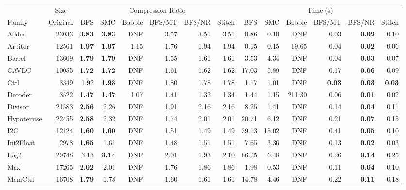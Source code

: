 \begin{tabular}{l r rrrrrr rrrrrr}
\toprule
& \multicolumn{1}{c}{Size} & \multicolumn{6}{c}{Compression Ratio} & \multicolumn{6}{c}{Time (s)} \\
\cmidrule(lr){2-2} \cmidrule(lr){3-8} \cmidrule(lr){9-14}
Family & Original & BFS & SMC & Babble & BFS/MT & BFS/NR & Stitch & BFS & SMC & Babble & BFS/MT & BFS/NR & Stitch \\
\midrule
Adder & 23033 & \textbf{3.83} & \textbf{3.83} & DNF & 3.57 & 3.51 & 3.51 & 0.86 & 0.10 & DNF & 0.03 & \textbf{0.02} & 0.10 \\
Arbiter & 12561 & \textbf{1.97} & \textbf{1.97} & 1.15 & 1.76 & 1.94 & 1.94 & 0.15 & 0.15 & 19.65 & 0.04 & \textbf{0.02} & 0.06 \\
Barrel & 13609 & \textbf{1.79} & \textbf{1.79} & DNF & 1.55 & 1.61 & 1.61 & 3.53 & 4.34 & DNF & 0.04 & \textbf{0.03} & 0.07 \\
CAVLC & 10055 & \textbf{1.72} & \textbf{1.72} & DNF & 1.61 & 1.62 & 1.62 & 17.03 & 5.89 & DNF & 0.17 & \textbf{0.06} & 0.09 \\
Ctrl & 3349 & 1.92 & \textbf{1.93} & DNF & 1.80 & 1.78 & 1.78 & 1.17 & 1.01 & DNF & \textbf{0.03} & \textbf{0.03} & \textbf{0.03} \\
Decoder & 3522 & \textbf{1.47} & \textbf{1.47} & 1.07 & 1.41 & 1.32 & 1.34 & 1.44 & 1.15 & 211.30 & 0.06 & \textbf{0.01} & 0.02 \\
Divisor & 21583 & \textbf{2.56} & 2.26 & DNF & 1.91 & 2.16 & 2.16 & 8.25 & 1.41 & DNF & 0.14 & \textbf{0.04} & 0.11 \\
Hypotenuse & 22455 & \textbf{2.58} & 2.32 & DNF & 1.74 & 2.01 & 2.01 & 20.71 & 6.12 & DNF & 0.21 & \textbf{0.07} & 0.15 \\
I2C & 12124 & \textbf{1.60} & \textbf{1.60} & DNF & 1.51 & 1.49 & 1.49 & 39.13 & 15.02 & DNF & 0.41 & \textbf{0.05} & 0.10 \\
Int2Float & 2978 & \textbf{1.65} & 1.61 & DNF & 1.48 & 1.51 & 1.51 & 7.65 & 3.36 & DNF & 0.13 & \textbf{0.02} & 0.03 \\
Log2 & 29748 & 3.13 & \textbf{3.14} & DNF & 2.01 & 1.93 & 2.10 & 86.25 & 6.48 & DNF & 0.26 & \textbf{0.14} & 0.25 \\
Max & 17265 & \textbf{2.02} & 2.01 & DNF & 1.76 & 1.86 & 1.86 & 1.98 & 0.53 & DNF & 0.11 & \textbf{0.04} & 0.10 \\
MemCtrl & 16708 & \textbf{1.79} & 1.78 & DNF & 1.60 & 1.61 & 1.61 & 14.78 & 4.46 & DNF & 0.22 & \textbf{0.11} & 0.18 \\

\end{tabular}
